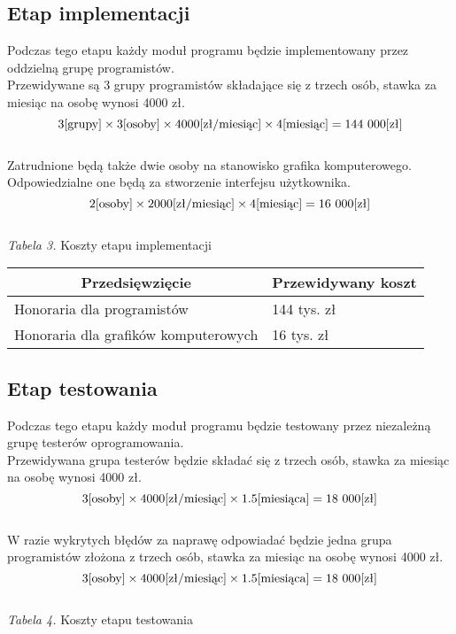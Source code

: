 \documentclass 	[11pt, a4paper, leqno]	{article}					%
\begin{document}
\subsection{Etap implementacji}
\noindent
Podczas tego etapu każdy moduł programu będzie implementowany przez oddzielną grupę programistów. \\
Przewidywane są 3 grupy programistów składające się z trzech osób, stawka za miesiąc na osobę wynosi 4000 zł. \\
\begin{equation}3 \text{[grupy]} \times 3 \text{[osoby]} \times 4000 \text{[zł/miesiąc]} \times  4 \text{[miesiąc]} = 144\\\ 000 \text{[zł]} \end{equation} \\
Zatrudnione będą także dwie osoby na stanowisko grafika komputerowego. Odpowiedzialne one będą za stworzenie interfejsu użytkownika. \\
\begin{equation}2 \text{[osoby]} \times 2000 \text{[zł/miesiąc]} \times 4 \text{[miesiąc]} = 16\\\ 000 \text{[zł]} \end{equation} \\
\newpage
\textit{Tabela 3.} Koszty etapu implementacji

\begin{center}
	\begin{tabular}{| l | l |}
		\hline
		\multicolumn{1}{|c|}{Przedsięwzięcie} & 
		\multicolumn{1}{|c|}{Przewidywany koszt} \\ \hline \hline
		Honoraria dla programistów & 144 tys. zł \\ \hline
		Honoraria dla grafików komputerowych & 16 tys. zł \\ \hline
	\end{tabular}
\end{center}

\subsection{Etap testowania}
\noindent
Podczas tego etapu każdy moduł programu będzie testowany przez niezależną grupę testerów oprogramowania. \\
Przewidywana grupa testerów będzie składać się z trzech osób, stawka za miesiąc na osobę wynosi 4000 zł. \\
\begin{equation}3 \text{[osoby]} \times 4000 \text{[zł/miesiąc]} \times 1.5 \text{[miesiąca]} = 18\\\ 000 \text{[zł]} \end{equation} \\
W razie wykrytych błędów za naprawę odpowiadać będzie jedna grupa programistów złożona z trzech osób, stawka za miesiąc na osobę wynosi 4000 zł. \\
\begin{equation}3 \text{[osoby]} \times 4000 \text{[zł/miesiąc]} \times 1.5 \text{[miesiąca]} = 18\\\ 000 \text{[zł]} \end{equation} \\
\textit{Tabela 4.} Koszty etapu testowania
\end{document}
